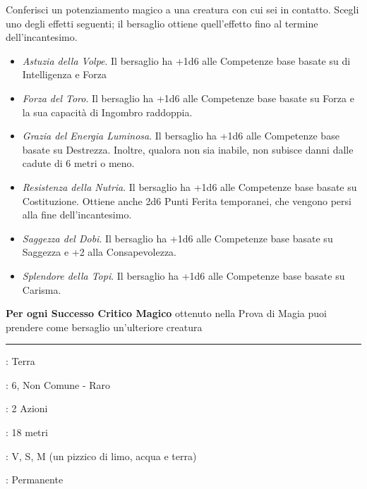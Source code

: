 \begin{multicols}{2}
Conferisci un potenziamento magico a una creatura con cui sei in contatto. Scegli uno degli effetti seguenti; il bersaglio ottiene quell'effetto fino al termine dell'incantesimo.

\begin{itemize}[leftmargin=*] \setlength{\itemsep}{0pt}
	\item \emph{Astuzia della Volpe}. Il bersaglio ha +1d6 alle Competenze base basate su di Intelligenza e Forza
	\item \emph{Forza del Toro}. Il bersaglio ha +1d6 alle Competenze base basate su Forza e la sua capacità di Ingombro raddoppia.
	\item \emph{Grazia del Energia Luminosa}. Il bersaglio ha +1d6 alle Competenze base basate su Destrezza. Inoltre, qualora non sia inabile, non subisce danni dalle cadute di 6 metri o meno.
	\item \emph{Resistenza della Nutria}. Il bersaglio ha +1d6 alle Competenze base basate su  Costituzione. Ottiene anche 2d6 Punti Ferita temporanei, che vengono persi alla fine dell'incantesimo.
	\item \emph{Saggezza del Dobi}. Il bersaglio ha +1d6 alle Competenze base basate su  Saggezza e +2 alla Consapevolezza.
	\item \emph{Splendore della Topi}. Il bersaglio ha +1d6 alle Competenze base basate su  Carisma.
\end{itemize}

\textbf{Per ogni Successo Critico Magico} ottenuto nella Prova di Magia puoi prendere come bersaglio un'ulteriore creatura

\smallskip\noindent\rule{\linewidth}{2pt} \hypertarget{Carne in Pietra - Pietra in Carne}{}\smallskip{}\hypertarget{Pietra in Carne}{}\hypertarget{Carbe in Pietra}{}
\noindent
\begin{description}[noitemsep, topsep=0pt, parsep=0pt, partopsep=0pt, leftmargin=0cm, labelwidth=2.8cm]
	\item[\textbf{Lista di Magia}]: Terra
	\item[\textbf{Livello}]: 6, Non Comune - Raro
	\item[\textbf{T. di Lancio}]: 2 Azioni
	\item[\textbf{Gittata}]: 18 metri
	\item[\textbf{Componenti}]: V, S, M (un pizzico di limo, acqua e terra)
	\item[\textbf{Durata}]: Permanente
\end{description}


\end{multicols}
